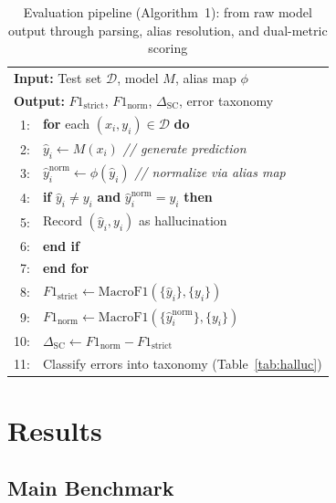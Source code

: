 \documentclass[journal]{IEEEtran}
\begin{document}
\begin{table}[!ht]
\centering
\caption{Evaluation pipeline (Algorithm~1): from raw model output through parsing, alias resolution, and dual-metric scoring}
\label{alg:eval}
\begin{tabular}{rl}
\toprule
\multicolumn{2}{l}{\textbf{Input:} Test set $\mathcal{D}$, model $M$, alias map $\phi$} \\
\multicolumn{2}{l}{\textbf{Output:} $F1_\text{strict}$, $F1_\text{norm}$, $\Delta_\text{SC}$, error taxonomy} \\
\midrule
1: & \textbf{for} each $(x_i, y_i) \in \mathcal{D}$ \textbf{do} \\
2: & \quad $\hat{y}_i \gets M(x_i)$ \quad\small\textit{// generate prediction} \\
3: & \quad $\hat{y}_i^\text{norm} \gets \phi(\hat{y}_i)$ \quad\small\textit{// normalize via alias map} \\
4: & \quad \textbf{if} $\hat{y}_i \neq y_i$ \textbf{and} $\hat{y}_i^\text{norm} = y_i$ \textbf{then} \\
5: & \quad\quad Record $(\hat{y}_i, y_i)$ as hallucination \\
6: & \quad \textbf{end if} \\
7: & \textbf{end for} \\
8: & $F1_\text{strict} \gets \text{MacroF1}(\{\hat{y}_i\}, \{y_i\})$ \\
9: & $F1_\text{norm} \gets \text{MacroF1}(\{\hat{y}_i^\text{norm}\}, \{y_i\})$ \\
10: & $\Delta_\text{SC} \gets F1_\text{norm} - F1_\text{strict}$ \\
11: & Classify errors into taxonomy (Table~\ref{tab:halluc}) \\
\bottomrule
\end{tabular}
\end{table}

\section{Results}

\subsection{Main Benchmark}
\end{document}
